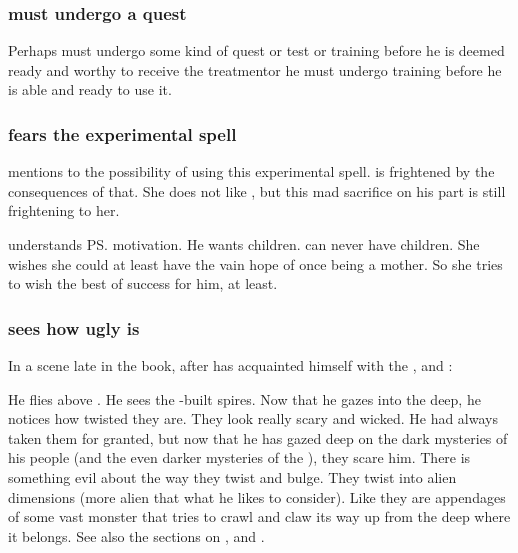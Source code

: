 \subsubsection{\Teshrial must undergo a quest}
Perhaps \Teshrial must undergo some kind of quest or test or training before he is deemed ready and worthy to receive the \neoresphan treatment\dash or he must undergo training before he is able and ready to use it. 





\subsubsection{\Achsah{} fears the experimental spell}
\Teshrial{} mentions to \Achsah{} the possibility of using this experimental spell. 
\Achsah{} is frightened by the consequences of that. 
She does not like \Teshrial, but this mad sacrifice on his part is still frightening to her. 

\Achsah{} understands \ps{\Teshrial} motivation. 
He wants children. 
\Achsah{} can never have children. 
She wishes she could at least have the vain hope of once being a mother. 
So she tries to wish the best of success for him, at least. 





\subsubsection{\Teshrial sees how ugly \Nyx is}
In a scene late in the book, after \Teshrial has acquainted himself with the \noggyaleth, \neoresphain and \WanderersInDarknessEmph:
  
He flies above \Nyx.
He sees the \bane-built spires. 
Now that he gazes into the deep, he notices how twisted they are.
They look really scary and wicked.
He had always taken them for granted, but now that he has gazed deep on the dark mysteries of his people (and the even darker mysteries of the \banes), they scare him.
There is something evil about the way they twist and bulge.
They twist into alien dimensions (more alien that what he likes to consider). 
Like they are appendages of some vast monster that tries to crawl and claw its way up from the deep where it belongs. 
See also the sections on ,  and . 









